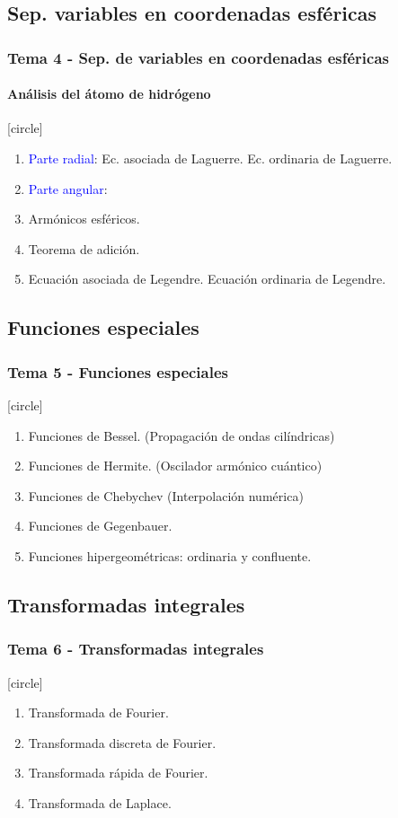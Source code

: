\subsection{Sep. variables en coordenadas esféricas}
\begin{frame}
\frametitle{Tema 4 - Sep. de variables en coordenadas esféricas}
\framesubtitle{Análisis del átomo de hidrógeno}
[circle]
\begin{enumerate}[<+->]
\item \textcolor{blue}{Parte radial}: Ec. asociada de Laguerre. Ec. ordinaria de Laguerre.
\item \textcolor{blue}{Parte angular}:
\item Armónicos esféricos.
\item Teorema de adición.
\item Ecuación asociada de Legendre. Ecuación ordinaria de Legendre.
\end{enumerate}
\end{frame}
\subsection{Funciones especiales}
\begin{frame}
\frametitle{Tema 5 - Funciones especiales}
[circle]
\begin{enumerate}[<+->]
\item Funciones de Bessel. (Propagación de ondas cilíndricas)
\item Funciones de Hermite. (Oscilador armónico cuántico)
\item Funciones de Chebychev (Interpolación numérica)
\item Funciones de Gegenbauer. 
\item Funciones hipergeométricas: ordinaria y confluente.
\end{enumerate}
\end{frame}
\subsection{Transformadas integrales}
\begin{frame}
\frametitle{Tema 6 - Transformadas integrales}
[circle]
\begin{enumerate}[<+->]
\item Transformada de Fourier.
\item Transformada discreta de Fourier.
\item Transformada rápida de Fourier.
\item Transformada de Laplace.
\end{enumerate}
\end{frame}
